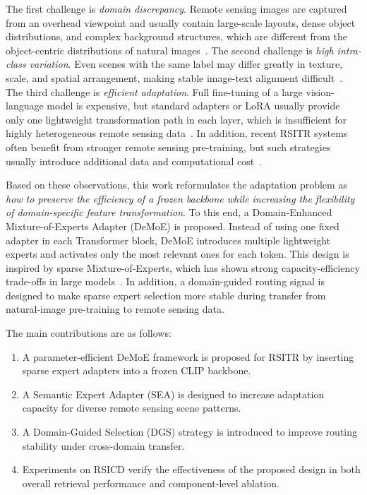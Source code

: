 \documentclass[conference]{IEEEtran}
\begin{document}
The first challenge is \emph{domain discrepancy}. Remote sensing images are captured from an overhead viewpoint and usually contain large-scale layouts, dense object distributions, and complex background structures, which are different from the object-centric distributions of natural images~\cite{ref2,ref4}. The second challenge is \emph{high intra-class variation}. Even scenes with the same label may differ greatly in texture, scale, and spatial arrangement, making stable image-text alignment difficult~\cite{ref5}. The third challenge is \emph{efficient adaptation}. Full fine-tuning of a large vision-language model is expensive, but standard adapters or LoRA usually provide only one lightweight transformation path in each layer, which is insufficient for highly heterogeneous remote sensing data~\cite{ref7}. In addition, recent RSITR systems often benefit from stronger remote sensing pre-training, but such strategies usually introduce additional data and computational cost~\cite{ref6,ref10}.

Based on these observations, this work reformulates the adaptation problem as \emph{how to preserve the efficiency of a frozen backbone while increasing the flexibility of domain-specific feature transformation}. To this end, a Domain-Enhanced Mixture-of-Experts Adapter (DeMoE) is proposed. Instead of using one fixed adapter in each Transformer block, DeMoE introduces multiple lightweight experts and activates only the most relevant ones for each token. This design is inspired by sparse Mixture-of-Experts, which has shown strong capacity-efficiency trade-offs in large models~\cite{ref8,ref9}. In addition, a domain-guided routing signal is designed to make sparse expert selection more stable during transfer from natural-image pre-training to remote sensing data.

The main contributions are as follows:
\begin{enumerate}
    \item A parameter-efficient DeMoE framework is proposed for RSITR by inserting sparse expert adapters into a frozen CLIP backbone.
    \item A Semantic Expert Adapter (SEA) is designed to increase adaptation capacity for diverse remote sensing scene patterns.
    \item A Domain-Guided Selection (DGS) strategy is introduced to improve routing stability under cross-domain transfer.
    \item Experiments on RSICD verify the effectiveness of the proposed design in both overall retrieval performance and component-level ablation.
\end{enumerate}
\end{document}

